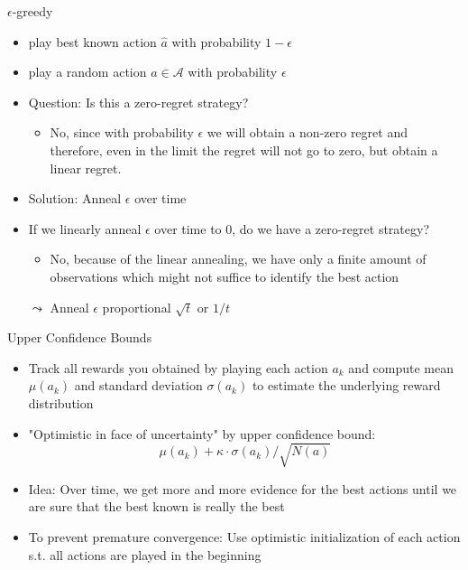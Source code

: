 \documentclass[aspectratio=169]{../latex_main/tntbeamer}  %
\begin{document}
\begin{frame}[c]{$\epsilon$-greedy}
	
	\begin{itemize}
		\item play best known action $\hat{a}$ with probability $1-\epsilon$
		\item play a random action $a \in \mathcal{A}$ with probability $\epsilon$ 
		\smallskip
		\item Question: Is this a zero-regret strategy?
		\pause
		\begin{itemize}
			\item No, since with probability $\epsilon$ we will obtain a non-zero regret and therefore, even in the limit the regret will not go to zero, but obtain a linear regret.
		\end{itemize}
		\smallskip\pause
		\item Solution: Anneal $\epsilon$ over time
		\item If we linearly anneal $\epsilon$ over time to $0$, do we have a zero-regret strategy?
		\pause
		\begin{itemize}
			\item No, because of the linear annealing, we have only a finite amount of observations which might not suffice to identify the best action
		\end{itemize}
		\smallskip
		\item[$\leadsto$] Anneal $\epsilon$ proportional $\sqrt{t}$ or $1/t$
	\end{itemize}
	
\end{frame}
\begin{frame}[c]{Upper Confidence Bounds}
	
	\begin{itemize}
		\item Track all rewards you obtained by playing each action $a_k$ and compute mean $\mu(a_k)$ and standard deviation $\sigma(a_k)$ to estimate the underlying reward distribution
		\item "Optimistic in face of uncertainty" by upper confidence bound:
		$$\mu(a_k) + \kappa \cdot \sigma(a_k) / \sqrt{N(a)}$$
		\item Idea: Over time, we get more and more evidence for the best actions until we are sure that the best known is really the best
		\medskip
		\pause
		\item To prevent premature convergence: Use optimistic initialization of each action\\ s.t. all actions are played in the beginning
	\end{itemize}
	
\end{frame}
\end{document}

